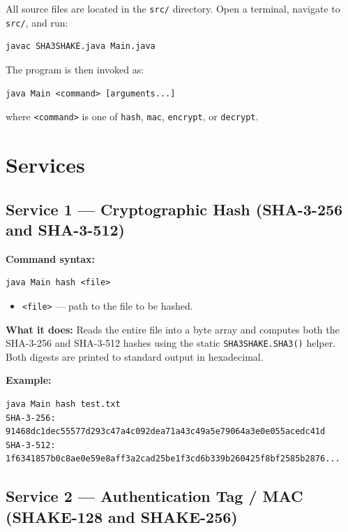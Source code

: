 \documentclass[11pt]{article}
\begin{document}
All source files are located in the \texttt{src/} directory. Open a terminal,
navigate to \texttt{src/}, and run:

\begin{lstlisting}
javac SHA3SHAKE.java Main.java
\end{lstlisting}

The program is then invoked as:

\begin{lstlisting}
java Main <command> [arguments...]
\end{lstlisting}

where \texttt{<command>} is one of \texttt{hash}, \texttt{mac},
\texttt{encrypt}, or \texttt{decrypt}.

\section{Services}

\subsection{Service 1 --- Cryptographic Hash (SHA-3-256 and SHA-3-512)}

\textbf{Command syntax:}
\begin{lstlisting}
java Main hash <file>
\end{lstlisting}

\begin{itemize}[noitemsep]
  \item \texttt{<file>} --- path to the file to be hashed.
\end{itemize}

\textbf{What it does:}
Reads the entire file into a byte array and computes both the SHA-3-256 and
SHA-3-512 hashes using the static \texttt{SHA3SHAKE.SHA3()} helper. Both
digests are printed to standard output in hexadecimal.

\textbf{Example:}
\begin{lstlisting}
java Main hash test.txt
SHA-3-256: 91468dc1dec55577d293c47a4c092dea71a43c49a5e79064a3e0e055acedc41d
SHA-3-512: 1f6341857b0c8ae0e59e8aff3a2cad25be1f3cd6b339b260425f8bf2585b2876...
\end{lstlisting}

\subsection{Service 2 --- Authentication Tag / MAC (SHAKE-128 and SHAKE-256)}
\end{document}
